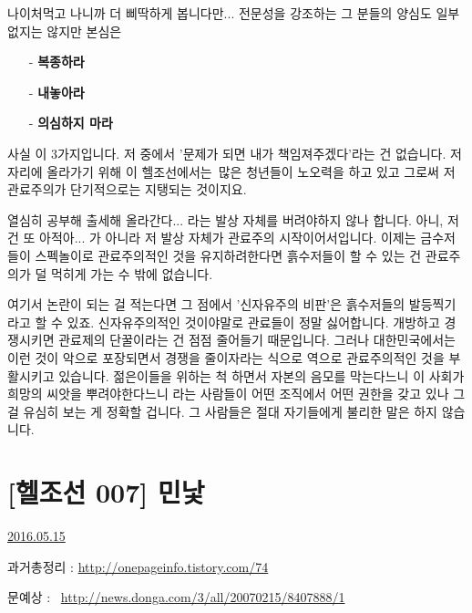 나이처먹고 나니까 더 삐딱하게 봅니다만... 전문성을 강조하는 그 분들의 양심도 일부 없지는 않지만 본심은
\vspace{5mm}
\begin{itemize}
    
    \item[-] \textbf{복종하라}
    \item[-] \textbf{내놓아라}
    \item[-] \textbf{의심하지 마라}
\end{itemize}
\vspace{5mm}

사실 이 3가지입니다. 저 중에서 '문제가 되면 내가 책임져주겠다'라는 건 없습니다.
저 자리에 올라가기 위해 이 헬조선에서는 많은 청년들이 노오력을 하고 있고 그로써 저 관료주의가 단기적으로는 지탱되는 것이지요.
\vspace{5mm}

열심히 공부해 출세해 올라간다... 라는 발상 자체를 버려야하지 않나 합니다.
아니, 저건 또 아적아... 가 아니라 저 발상 자체가 관료주의 시작이어서입니다.
이제는 금수저들이 스펙놀이로 관료주의적인 것을 유지하려한다면 흙수저들이 할 수 있는 건 관료주의가 덜 먹히게 가는 수 밖에 없습니다.
\vspace{5mm}

여기서 논란이 되는 걸 적는다면 그 점에서 '신자유주의 비판'은 흙수저들의 발등찍기라고 할 수 있죠.
신자유주의적인 것이야말로 관료들이 정말 싫어합니다. 개방하고 경쟁시키면 관료제의 단꿀이라는 건 점점 줄어들기 때문입니다.
그러나 대한민국에서는 이런 것이 악으로 포장되면서 경쟁을 줄이자라는 식으로 역으로 관료주의적인 것을 부활시키고 있습니다.
젊은이들을 위하는 척 하면서 자본의 음모를 막는다느니 이 사회가 희망의 씨앗을 뿌려야한다느니 라는 사람들이
어떤 조직에서 어떤 권한을 갖고 있나 그걸 유심히 보는 게 정확할 겁니다. 그 사람들은 절대 자기들에게 불리한 말은 하지 않습니다.
\vspace{5mm}





\section{[헬조선 007] 민낯}
\href{https://www.kockoc.com/Apoc/774887}{2016.05.15}

\vspace{5mm}

과거총정리 : \url{http://onepageinfo.tistory.com/74}
\vspace{5mm}

문예상 :  \url{http://news.donga.com/3/all/20070215/8407888/1}
\vspace{5mm}

